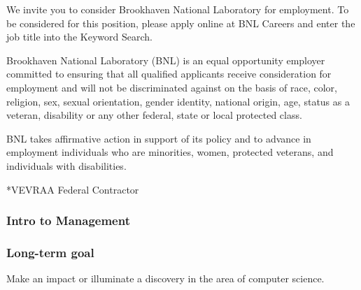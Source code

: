 \begin{frame}[label=jobApp]
{We invite you to consider Brookhaven National Laboratory for
employment. To be considered for this position, please apply online at
BNL Careers and enter the job title into the Keyword Search.

Brookhaven National Laboratory (BNL) is an equal opportunity employer
committed to ensuring that all qualified applicants receive
consideration for employment and will not be discriminated against on
the basis of race, color, religion, sex, sexual orientation, gender
identity, national origin, age, status as a veteran, disability or any
other federal, state or local protected class.

BNL takes affirmative action in support of its policy and to advance
in employment individuals who are minorities, women, protected
veterans, and individuals with disabilities.

*VEVRAA Federal Contractor
}

\end{frame}


\begin{frame}
\frametitle{Intro to Management}
\end{frame}


\begin{frame}
\frametitle{Long-term goal}
Make an impact or illuminate a discovery in the area of computer science. 
\end{frame} 


